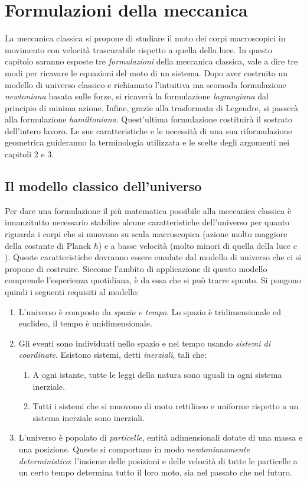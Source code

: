 \chapter{Formulazioni della meccanica}
La meccanica classica si propone di studiare il moto dei corpi macroscopici in movimento con velocità trascurabile rispetto a quella della luce. In questo capitolo saranno esposte tre \emph{formulazioni} della meccanica classica, vale a dire tre modi per ricavare le equazioni del moto di un sistema. Dopo aver costruito un modello di universo classico e richiamato l'intuitiva ma scomoda formulazione \emph{newtoniana} basata sulle forze, si ricaverà la formulazione \emph{lagrangiana} dal principio di minima azione. Infine, grazie alla trasformata di Legendre, si passerà alla formulazione \emph{hamiltoniana}. Quest'ultima formulazione costituirà il sostrato dell'intero lavoro. Le sue caratteristiche e le necessità di una sua riformulazione geometrica guideranno la terminologia utilizzata e le scelte degli argomenti nei capitoli 2 e 3. 

\section{Il modello classico dell'universo}
Per dare una formulazione il più matematica possibile alla meccanica classica è innanzitutto necessario stabilire alcune caratteristiche dell'universo per quanto riguarda i corpi che si muovono su scala macroscopica (azione molto maggiore della costante di Planck $\hbar$) e a basse velocità (molto minori di quella della luce $c$). Queste caratteristiche dovranno essere emulate dal modello di universo che ci si propone di costruire. Siccome l'ambito di applicazione di questo modello comprende l'esperienza quotidiana, è da essa che si può trarre spunto. Si pongono quindi i seguenti requisiti al modello:
\begin{enumerate}
  \item L'universo è composto da \emph{spazio e tempo}. Lo spazio è tridimensionale ed euclideo, il tempo è unidimensionale.
  \item  Gli eventi sono individuati nello spazio e nel tempo usando \emph{sistemi di coordinate}. Esistono sistemi, detti \emph{inerziali}, tali che:
  \begin{enumerate}
    \item A ogni istante, tutte le leggi della natura sono uguali in ogni sistema inerziale.
    \item Tutti i sistemi che si muovono di moto rettilineo e uniforme rispetto a un sistema inerziale sono inerziali.
  \end{enumerate}
  \item L'universo è popolato di \emph{particelle}, entità adimensionali dotate di una massa e una posizione. Queste si comportano in modo \emph{newtonianamente deterministico}: l'insieme delle posizioni e delle velocità di tutte le particelle a un certo tempo determina tutto il loro moto, sia nel passato che nel futuro.
\end{enumerate}

